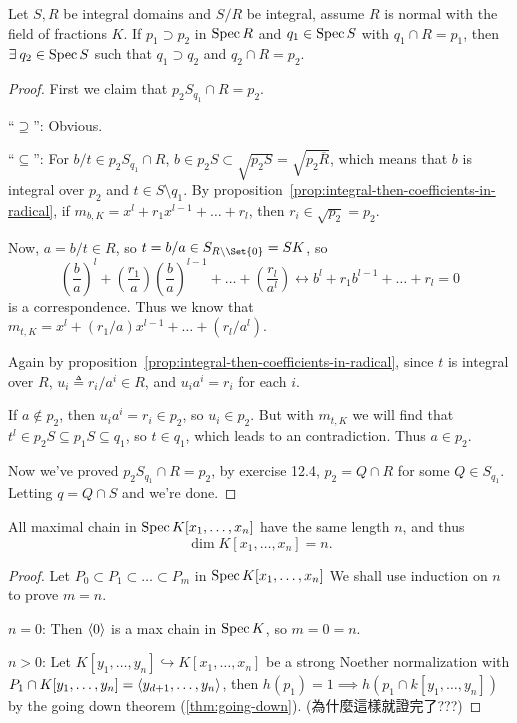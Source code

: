 \begin{theorem} \label{thm:going-down}
  Let $S, R$ be integral domains and $S/R$ be integral, assume $R$ is normal
  with the field of fractions $K$. If $p_1 \supset p_2$ in $\operatorname{Spec} R$ and $q_1 \in \operatorname{Spec} S$
  with $q_1 \cap R = p_1$,
  then $\exists q_2 \in \Spec S$ such that $q_1 \supset q_2$ and $q_2 \cap R = p_2$.

  \begin{proof}
    First we claim that $p_2 S_{q_1} \cap R = p_2$.

    ``$\supseteq$'': Obvious.

    ``$\subseteq$'': For $b/t \in p_2 S_{q_1} \cap R$, $b \in p_2 S \subset \sqrt{p_2 S}
    = \sqrt{p_2 \overline{R}}$, which means that $b$ is integral over $p_2$
    and $t \in S \setminus q_1$. By proposition~\ref{prop:integral-then-coefficients-in-radical},
    if $m_{b, K} = x^l + r_1 x^{l-1} + \dots + r_l$, then $r_i \in \sqrt{p_2} = p_2$.

    Now, $a = b/t \in R$, so $t = b/a \in S_{R \setminus \Set{0}} = SK$,
    so
    \[ \left( \frac{b}{a} \right)^l + 
      \left(\frac{r_1}{a}\right) \left( \frac{b}{a} \right)^{l-1} + \dots
      + \left(\frac{r_l}{a^l}\right) \leftrightarrow b^l + r_1 b^{l-1} + \dots + r_l = 0 \]
    is a correspondence. Thus we know that
    $m_{t, K} = x^l + (r_1/a) x^{l-1} + \dots + (r_l/a^l)$.

    Again by proposition~\ref{prop:integral-then-coefficients-in-radical},
    since $t$ is integral over $R$, $u_i \triangleq r_i / a^i \in R$,
    and $u_i a^i = r_i$ for each $i$.

    If $a \not\in p_2$, then $u_i a^i = r_i \in p_2$, so $u_i \in p_2$.
    But with $m_{t, K}$ we will find that $t^l \in p_2 S \subseteq p_1 S \subseteq q_1$,
    so $t \in q_1$, which leads to an contradiction. Thus $a \in p_2$.

    Now we've proved $p_2 S_{q_1} \cap R = p_2$,
    by exercise 12.4, $p_2 = Q \cap R$ for some $Q \in S_{q_1}$.
    Letting $q = Q \cap S$ and we're done.
  \end{proof}
\end{theorem}

\begin{theorem}
  All maximal chain in $\operatorname{Spec} K[x_1, \dots, x_n]$ have the same length $n$, and thus
  \[ \dim K[x_1, \dots, x_n] = n. \]

  \begin{proof}
    Let $P_0 \subset P_1 \subset \dots \subset P_m$ in $\operatorname{Spec} K[x_1, \dots, x_n]$
    We shall use induction on $n$ to prove $m = n$.

    $n = 0$: Then $\langle0\rangle$ is a max chain in $\operatorname{Spec} K$, so $m = 0 = n$.

    $n > 0$: Let $K[y_1, \dots, y_n] \hookrightarrow K[x_1, \dots, x_n]$
    be a strong Noether normalization with $P_1 \cap K[y_1, \dots, y_n] = \langle y_{d+1}, \dots, y_n\rangle$,
    then $h(p_1) = 1 \implies h(p_1 \cap k[y_1, \dots, y_n])$ by
    the going down theorem (\ref{thm:going-down}). (為什麼這樣就證完了???)
  \end{proof}
\end{theorem}
